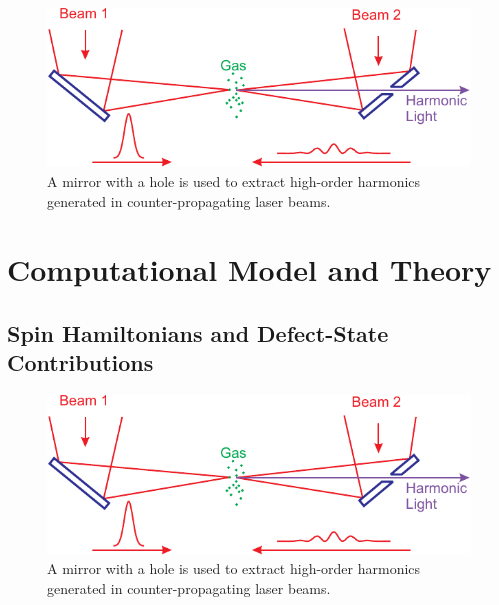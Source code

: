 \documentclass[oneside, astronomy, noacknowlegments]{BYUPhys}
\begin{document}
\begin{figure}
    \centerline{\includegraphics{Graphic1}}
    \caption[Magnetic field and microwave frequency relationship]{\label{fig:MFRelationship}
     A mirror with a hole is used to extract high-order harmonics generated in
     counter-propagating laser beams.}
 \end{figure}

\section{}
\section{}

\chapter{Computational Model and Theory}
\section{}
\section{}
\section{Spin Hamiltonians and Defect-State Contributions}

\begin{figure}
    \centerline{\includegraphics{Graphic1}}
    \caption[Example of spin-hamiltonion fields]{\label{fig:HamFields}
     A mirror with a hole is used to extract high-order harmonics generated in
     counter-propagating laser beams.}
 \end{figure}
\end{document}
